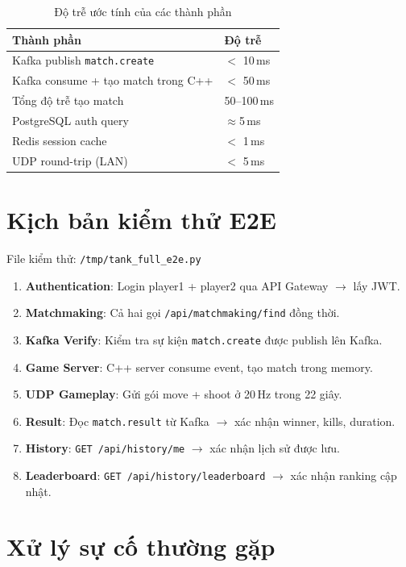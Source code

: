 \documentclass[12pt,a4paper]{report}
\newcommand{\topic}[1]{\texttt{\textcolor{micropurple}{#1}}}
\begin{document}
\begin{table}[H]
\centering
\caption{Độ trễ ước tính của các thành phần}
\label{tab:latency}
\begin{tabular}{ll}
\toprule
\textbf{Thành phần} & \textbf{Độ trễ} \\
\midrule
Kafka publish \texttt{match.create}        & $<$ 10\,ms \\
Kafka consume + tạo match trong C++        & $<$ 50\,ms \\
Tổng độ trễ tạo match                      & 50--100\,ms \\
PostgreSQL auth query                      & $\approx$5\,ms \\
Redis session cache                        & $<$ 1\,ms \\
UDP round-trip (LAN)                       & $<$ 5\,ms \\
\bottomrule
\end{tabular}
\end{table}

\section{Kịch bản kiểm thử E2E}

File kiểm thử: \texttt{/tmp/tank\_full\_e2e.py}

\begin{enumerate}
  \item \textbf{Authentication}: Login player1 + player2 qua API Gateway $\rightarrow$ lấy JWT.
  \item \textbf{Matchmaking}: Cả hai gọi \texttt{/api/matchmaking/find} đồng thời.
  \item \textbf{Kafka Verify}: Kiểm tra sự kiện \topic{match.create} được publish lên Kafka.
  \item \textbf{Game Server}: C++ server consume event, tạo match trong memory.
  \item \textbf{UDP Gameplay}: Gửi gói move + shoot ở 20\,Hz trong 22 giây.
  \item \textbf{Result}: Đọc \topic{match.result} từ Kafka $\rightarrow$ xác nhận winner, kills, duration.
  \item \textbf{History}: \texttt{GET /api/history/me} $\rightarrow$ xác nhận lịch sử được lưu.
  \item \textbf{Leaderboard}: \texttt{GET /api/history/leaderboard} $\rightarrow$ xác nhận ranking cập nhật.
\end{enumerate}

\section{Xử lý sự cố thường gặp}
\end{document}
